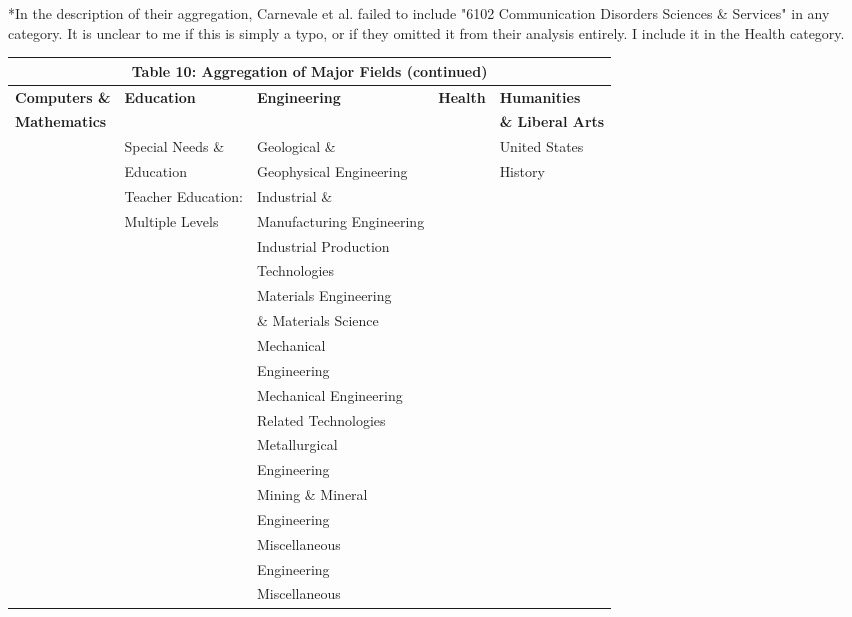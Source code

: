 \documentclass[11pt]{article}
\theoremstyle{definition}
\begin{document}
*In the description of their aggregation, Carnevale et al. failed to include "6102 Communication Disorders Sciences \& Services" in any category.  It is unclear to me if this is simply a typo, or if they omitted it from their analysis entirely.  I include it in the Health category.  


\newpage
\vspace{2.5mm}
\noindent
\begin{center}
\begingroup \scriptsize
\begin{tabular}{|l| l| l| l |l|}
\hline\hline
\multicolumn{5}{c}{\textbf{Table 10: Aggregation of Major Fields (continued)}} \\
\hline\hline 
\textbf{Computers \&} & \textbf{Education} & \textbf{Engineering} & \textbf{Health} & \textbf{Humanities}  \\
 \textbf{Mathematics} &\textbf{} & \textbf{} &\textbf{} &  \textbf{\& Liberal Arts}   \\ 
 \hline\hline \rowcolor{Gray} 
  & Special Needs \&  & Geological \& & & United States \\ 
 \rowcolor{Gray}
  & Education & Geophysical Engineering &  & History \\
 \hline
  & Teacher Education: & Industrial \& & &  \\
  &  Multiple Levels & Manufacturing Engineering & & \\
 \hline \rowcolor{Gray}
  &  & Industrial Production & & \\
 \rowcolor{Gray}
 &  & Technologies &  & \\
 \hline
  &  & Materials Engineering & &  \\
 &  & \& Materials Science &  & \\
  \hline \rowcolor{Gray}
 &  & Mechanical & & \\
\rowcolor{Gray}
 &  & Engineering & & \\
  \hline
 &   & Mechanical Engineering & & \\
 &  & Related Technologies & & \\
  \hline \rowcolor{Gray}
&  & Metallurgical & & \\
\rowcolor{Gray}
  & & Engineering & & \\
  \hline
 &  & Mining \& Mineral & & \\
  & & Engineering &  & \\
  \hline \rowcolor{Gray}
  & & Miscellaneous & & \\
 \rowcolor{Gray}
  &  & Engineering & & \\
 \hline 
 &  & Miscellaneous &  & \\

\end{tabular}
\end{center}
\end{document}
